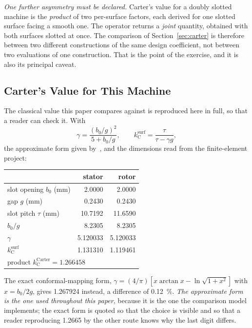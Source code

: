 \documentclass[10pt,a4paper,twocolumn]{article}
\theoremstyle{plain}
\theoremstyle{remark}
\begin{document}
\emph{One further asymmetry must be declared.} Carter's value for a
doubly slotted machine is the \emph{product} of two per-surface factors,
each derived for one slotted surface facing a smooth one. The operator
returns a \emph{joint} quantity, obtained with both surfaces slotted at
once. The comparison of Section~\ref{sec:carter} is therefore between
two different constructions of the same design coefficient, not between
two evaluations of one construction. That is the point of the exercise,
and it is also its principal caveat.

\subsection{Carter's Value for This Machine}
\label{sub:carterval}

The classical value this paper compares against is reproduced here in
full, so that a reader can check it. With
\begin{equation}
\gamma=\frac{(b_0/g)^2}{5+b_0/g},
\qquad
k_{\mathrm{C}}^{\text{surf}}=\frac{\tau}{\tau-\gamma g},
\label{eq:carterform}
\end{equation}
the approximate form given by~\cite{carter,pyrhonen}, and the dimensions
read from the finite-element project:

\begin{center}\footnotesize
\begin{tabular}{lrr}
\toprule
 & stator & rotor \\
\midrule
slot opening $b_0$ (\si{\milli\metre}) & 2.0000 & 2.0000 \\
gap $g$ (\si{\milli\metre})            & 0.2430 & 0.2430 \\
slot pitch $\tau$ (\si{\milli\metre})  & 10.7192 & 11.6590 \\
$b_0/g$                                & 8.2305 & 8.2305 \\
$\gamma$                               & 5.120033 & 5.120033 \\
$k_{\mathrm{C}}^{\text{surf}}$           & 1.131310 & 1.119461 \\
\midrule
\multicolumn{3}{l}{product $k_{\mathrm{C}}^{\text{Carter}}
 = \num{1.266458}$}\\
\bottomrule
\end{tabular}
\end{center}

\vspace{2mm}

The exact conformal-mapping form,
$\gamma=(4/\pi)\left[x\arctan x-\ln\sqrt{1+x^2}\right]$ with
$x=b_0/2g$, gives \num{1.267924} instead, a difference of
\SI{0.12}{\percent}. \emph{The approximate form is the one used
throughout this paper}, because it is the one the comparison model
implements; the exact form is quoted so that the choice is visible and
so that a reader reproducing \num{1.2665} by the other route knows why
the last digit differs.
\end{document}
